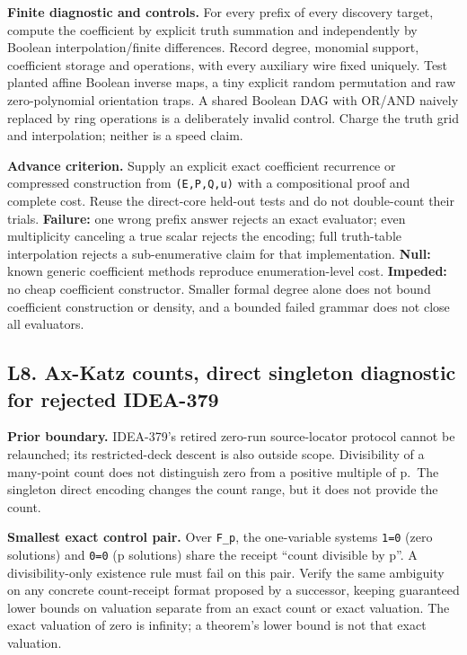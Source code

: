 \documentclass[
  10pt,
]{article}
\begin{document}
\textbf{Finite diagnostic and controls.} For every prefix of every
discovery target, compute the coefficient by explicit truth summation
and independently by Boolean interpolation/finite differences. Record
degree, monomial support, coefficient storage and operations, with every
auxiliary wire fixed uniquely. Test planted affine Boolean inverse maps,
a tiny explicit random permutation and raw zero-polynomial orientation
traps. A shared Boolean DAG with OR/AND naively replaced by ring
operations is a deliberately invalid control. Charge the truth grid and
interpolation; neither is a speed claim.

\textbf{Advance criterion.} Supply an explicit exact coefficient
recurrence or compressed construction from \texttt{(E,P,Q,u)} with a
compositional proof and complete cost. Reuse the direct-core held-out
tests and do not double-count their trials. \textbf{Failure:} one wrong
prefix answer rejects an exact evaluator; even multiplicity canceling a
true scalar rejects the encoding; full truth-table interpolation rejects
a sub-enumerative claim for that implementation. \textbf{Null:} known
generic coefficient methods reproduce enumeration-level cost.
\textbf{Impeded:} no cheap coefficient constructor. Smaller formal
degree alone does not bound coefficient construction or density, and a
bounded failed grammar does not close all evaluators.

\subsection{L8. Ax-Katz counts, direct singleton diagnostic for rejected
IDEA-379}\label{l8.-ax-katz-counts-direct-singleton-diagnostic-for-rejected-idea-379}

\textbf{Prior boundary.} IDEA-379's retired zero-run source-locator
protocol cannot be relaunched; its restricted-deck descent is also
outside scope. Divisibility of a many-point count does not distinguish
zero from a positive multiple of p.~The singleton direct encoding
changes the count range, but it does not provide the count.

\textbf{Smallest exact control pair.} Over \texttt{F\_p}, the
one-variable systems \texttt{1=0} (zero solutions) and \texttt{0=0} (p
solutions) share the receipt ``count divisible by p''. A
divisibility-only existence rule must fail on this pair. Verify the same
ambiguity on any concrete count-receipt format proposed by a successor,
keeping guaranteed lower bounds on valuation separate from an exact
count or exact valuation. The exact valuation of zero is infinity; a
theorem's lower bound is not that exact valuation.
\end{document}
